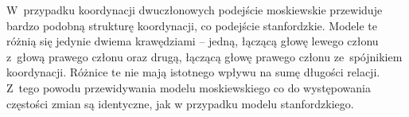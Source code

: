 W~przypadku koordynacji dwuczłonowych podejście moskiewskie przewiduje bardzo podobną strukturę koordynacji, co podejście stanfordzkie. Modele te różnią się jedynie dwiema krawędziami -- jedną, łączącą głowę lewego członu z~głową prawego członu oraz drugą, łączącą głowę prawego członu ze~spójnikiem koordynacji. Różnice te nie mają istotnego wpływu na sumę długości relacji. Z~tego powodu przewidywania modelu moskiewskiego co do występowania częstości zmian są identyczne, jak w przypadku modelu stanfordzkiego.